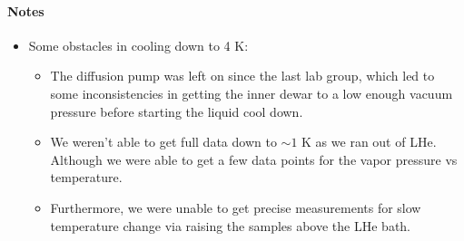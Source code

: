\documentclass{article}
\begin{document}
\paragraph{Notes}
\begin{itemize}
    \item Some obstacles in cooling down to 4 K:
    \begin{itemize}
        \item The diffusion pump was left on since the last lab group, which led to some inconsistencies in getting the
        inner dewar to a low enough vacuum pressure before starting the liquid cool down.
        \item We weren't able to get full data down to $\sim 1$ K as we ran out of LHe. 
        Although we were able to get a few data points for the vapor pressure vs temperature. 
        \item Furthermore, we were unable to get precise measurements for slow temperature change via raising the samples above the LHe bath.
    \end{itemize}
\end{itemize}

\newpage
{}
\end{document}
